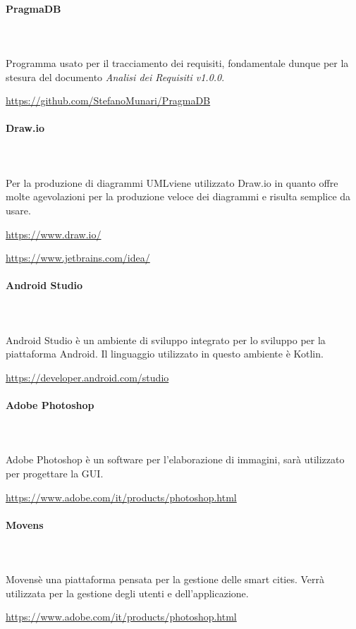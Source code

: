 		\paragraph{PragmaDB} \mbox{}\\ \mbox{}\\
		Programma usato per il tracciamento dei requisiti, fondamentale dunque per la stesura del documento \textit{Analisi dei Requisiti v1.0.0}. \newline
		\centerline{\url{https://github.com/StefanoMunari/PragmaDB}}
		\paragraph{Draw.io} \mbox{}\\ \mbox{}\\
		Per la produzione di diagrammi UML\glosp viene utilizzato Draw.io in quanto offre molte agevolazioni per la produzione veloce dei diagrammi e risulta semplice da usare. \newline
		\centerline{\url{https://www.draw.io/}}
		\centerline{\url{https://www.jetbrains.com/idea/}}
		\paragraph{Android Studio} \mbox{}\\ \mbox{}\\
		Android Studio è un ambiente di sviluppo integrato per lo sviluppo per la piattaforma Android\glo. Il linguaggio utilizzato in questo ambiente è Kotlin\glo. 
		 \newline
		\centerline{\url{https://developer.android.com/studio}}
		\paragraph{Adobe Photoshop} \mbox{}\\ \mbox{}\\
		Adobe Photoshop è un software per l'elaborazione di immagini, sarà utilizzato per progettare la GUI\glo.
		\newline
		\centerline{\url{https://www.adobe.com/it/products/photoshop.html}}
			\paragraph{Movens} \mbox{}\\ \mbox{}\\
		Movens\glosp è una piattaforma pensata per la gestione delle smart cities. Verrà utilizzata per la gestione degli utenti e dell'applicazione.
		\newline
		\centerline{\url{https://www.adobe.com/it/products/photoshop.html}}
